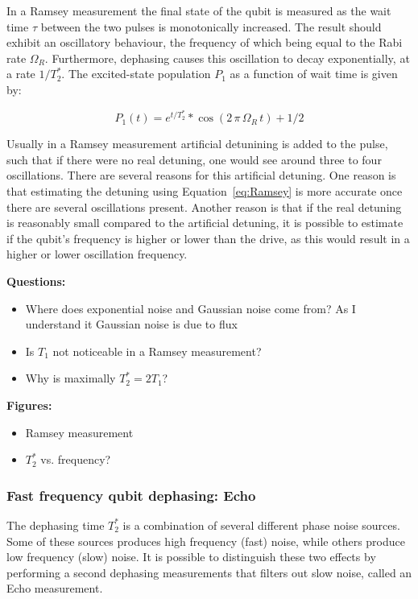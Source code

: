           In a Ramsey measurement the final state of the qubit is measured as the wait time $\tau$ between the two pulses is monotonically increased. The result should exhibit an oscillatory behaviour, the frequency of which being equal to the Rabi rate $\Omega_R$. Furthermore, dephasing causes this oscillation to decay exponentially, at a rate $1/T_2^*$. The excited-state population $P_1$ as a function of wait time is given by:

          \begin{equation}
            P_1(t) = e^{t/T_2^*} * \cos{\left( 2 \, \pi \, \Omega_R \, t \right) + 1/2}
            \label{eq:Ramsey}
          \end{equation}

          Usually in a Ramsey measurement artificial detunining is added to the pulse, such that if there were no real detuning, one would see around three to four oscillations. There are several reasons for this artificial detuning. One reason is that estimating the detuning using Equation~\ref{eq:Ramsey} is more accurate once there are several oscillations present. Another reason is that if the real detuning is reasonably small compared to the artificial detuning, it is possible to estimate if the qubit's frequency is higher or lower than the drive, as this would result in a higher or lower oscillation frequency.



          \textbf{Questions:}
          \begin{itemize}
            \item Where does exponential noise and Gaussian noise come from? As I understand it Gaussian noise is due to flux
            \item Is $T_1$ not noticeable in a Ramsey measurement?
            \item Why is maximally $T_2^*=2T_1$?
          \end{itemize}

          \textbf{Figures:}
          \begin{itemize}
            \item Ramsey measurement
            \item $T_2^*$ vs. frequency?
          \end{itemize}

        \subsubsection{Fast frequency qubit dephasing: Echo}
          The dephasing time $T_2^*$ is a combination of several different phase noise sources. Some of these sources produces high frequency (fast) noise, while others produce low frequency (slow) noise. It is possible to distinguish these two effects by performing a second dephasing measurements that filters out slow noise, called an Echo measurement.

